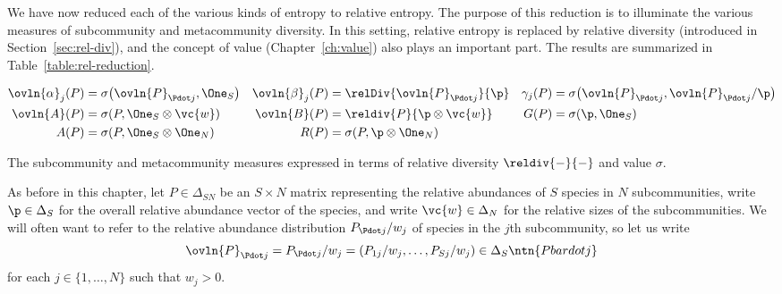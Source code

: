 We have now reduced each of the various kinds of entropy to relative
entropy.  The purpose of this reduction is to illuminate the various
measures of subcommunity%
%
% 
and metacommunity%
%
% 
diversity.  In this setting, relative entropy is replaced by relative%
%
%
% 
diversity (introduced in Section~\ref{sec:rel-div}), and the concept of
value (Chapter~\ref{ch:value}) also plays an important part.  The results
are summarized in Table~\ref{table:rel-reduction}.

\begin{table}
\centering%
\parbox{.98\textwidth}{%
\normalsize%
\begin{align*}
\ovln{\alpha}_j(P)      &= \sigma\bigl(\ovln{P}_{\Pdot j}, \One_S\bigr)&
\ovln{\beta}_j(P)       &= \relDiv{\ovln{P}_{\Pdot j}}{\p}      &
\gamma_j(P)             &
= \sigma\bigl(\ovln{P}_{\Pdot j}, \ovln{P}_{\Pdot j}/\p\bigr)   \\
\ovln{A}(P)             &= \sigma(P, \One_S \otimes \vc{w})     &
\ovln{B}(P)             &= \reldiv{P}{\p \otimes \vc{w}}        &
G(P)                    &= \sigma(\p, \One_S)           \\
A(P)                    &= \sigma(P, \One_S \otimes \One_N)     &
R(P)                    &= \sigma(P, \p \otimes \One_N)
\end{align*}}
\caption{The subcommunity and metacommunity measures expressed in terms of
  relative diversity $\reldiv{-}{-}$ and value $\sigma$.}
\end{table}

As before in this chapter, let $P \in \Delta_{SN}$ be an $S \times N$
matrix representing the relative abundances of $S$ species in $N$
subcommunities, write $\p \in \Delta_S$ for the overall relative abundance
vector of the species, and write $\vc{w} \in \Delta_N$ for the relative
sizes of the subcommunities.  
We will often want to refer to the relative abundance
distribution $P_{\Pdot j}/w_j$ of species in the $j$th subcommunity, so let
us write
\[
\ovln{P}_{\Pdot j} 
= 
P_{\Pdot j}/w_j
=
( P_{1j}/w_j, \ldots, P_{Sj}/w_j )
\in 
\Delta_S
\ntn{Pbardotj}
\]
for each $j \in \{1, \ldots, N\}$ such that $w_j > 0$.

